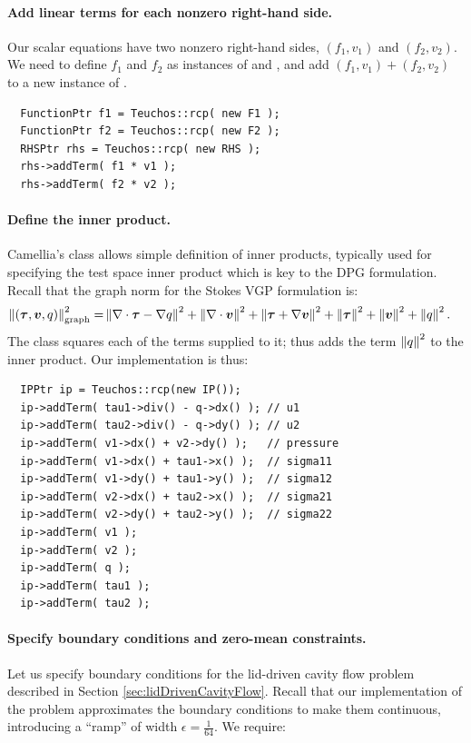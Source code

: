 \paragraph{Add linear terms for each nonzero right-hand side.}
Our scalar equations have two nonzero right-hand sides, $(f_{1},v_{1})$ and $(f_{2},v_{2})$.  We need to define $f_{1}$ and $f_{2}$ as instances of  and , and add $(f_{1},v_{1}) + (f_{2},v_{2})$ to a new instance of .

\begin{lstlisting}
  FunctionPtr f1 = Teuchos::rcp( new F1 );
  FunctionPtr f2 = Teuchos::rcp( new F2 );
  RHSPtr rhs = Teuchos::rcp( new RHS );
  rhs->addTerm( f1 * v1 );
  rhs->addTerm( f2 * v2 );
\end{lstlisting}

\paragraph{Define the inner product.}
Camellia's  class allows simple definition of inner products, typically used for specifying the test space inner product which is key to the DPG formulation.  Recall that the graph norm for the Stokes VGP formulation is:
\begin{align*}
\norm{(\NVRtensor{\tau},\vect{v}, q)}_{\rm graph}^{2} =& \norm{\NVRdiv \NVRtensor{\tau} - \NVRgrad q}^{2} + \norm{\NVRdiv \vect{v}}^{2} + \norm{ \NVRtensor{\tau} + \NVRgrad{\vect{v}}}^{2} + \norm{\NVRtensor{\tau}}^{2} + \norm{\vect{v}}^{2} + \norm{q}^{2}.
\end{align*}
The  class squares each of the terms supplied to it; thus  adds the term $\norm{q}^{2}$ to the inner product.  Our implementation is thus:

\begin{lstlisting}
  IPPtr ip = Teuchos::rcp(new IP());
  ip->addTerm( tau1->div() - q->dx() ); // u1
  ip->addTerm( tau2->div() - q->dy() ); // u2
  ip->addTerm( v1->dx() + v2->dy() );   // pressure
  ip->addTerm( v1->dx() + tau1->x() );  // sigma11
  ip->addTerm( v1->dy() + tau1->y() );  // sigma12
  ip->addTerm( v2->dx() + tau2->x() );  // sigma21
  ip->addTerm( v2->dy() + tau2->y() );  // sigma22
  ip->addTerm( v1 );
  ip->addTerm( v2 );
  ip->addTerm( q );
  ip->addTerm( tau1 );
  ip->addTerm( tau2 );
\end{lstlisting}

\paragraph{Specify boundary conditions and zero-mean constraints.}
Let us specify boundary conditions for the lid-driven cavity flow problem described in Section \ref{sec:lidDrivenCavityFlow}.  Recall that our implementation of the problem approximates the boundary conditions to make them continuous, introducing a ``ramp'' of width $\epsilon=\frac{1}{64}$.  We require:

